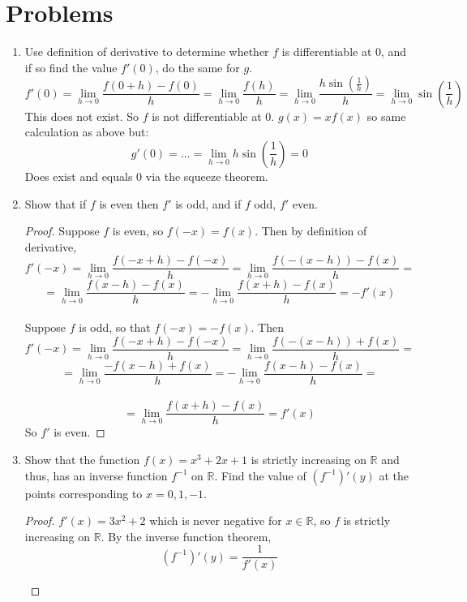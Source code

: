 \documentclass[hidelinks,12pt]{article}
\title{\scalebox{2}{Math 523 Homework 6}}
\author{\scalebox{1.5}{Theo Koss}}
\date{December 2023}
\newcommand{\R}{\mathbb{R}}
\begin{document}
\maketitle

\section*{Problems}
\begin{enumerate}
    \item Use definition of derivative to determine whether $f$ is differentiable at $0$, and if so find the value $f'\left(0\right)$, do the same for $g$. $$f'\left(0\right)=\lim_{h\to0}\frac{f\left(0+h\right)-f\left(0\right)}{h}=\lim_{h\to0}\frac{f\left(h\right)}{h}=\lim_{h\to0}\frac{h\sin\left(\frac{1}{h}\right)}{h}=\lim_{h\to0}\sin\left(\frac{1}{h}\right)$$ This does not exist. So $f$ is not differentiable at $0$. $g\left(x\right)=xf\left(x\right)$ so same calculation as above but: $$g'\left(0\right)=\dots=\lim_{h\to0}h\sin\left(\frac{1}{h}\right)=0$$ Does exist and equals 0 via the squeeze theorem. 
    \item Show that if $f$ is even then $f'$ is odd, and if $f$ odd, $f'$ even.\begin{proof}
        Suppose $f$ is even, so $f\left(-x\right)=f\left(x\right)$. Then by definition of derivative, $$f'\left(-x\right)=\lim_{h\to0}\frac{f\left(-x+h\right)-f\left(-x\right)}{h}=\lim_{h\to0}\frac{f\left(-\left(x-h\right)\right)-f\left(x\right)}{h}=$$
        $$=\lim_{h\to0}\frac{f\left(x-h\right)-f\left(x\right)}{h}=-\lim_{h\to0}\frac{f\left(x+h\right)-f\left(x\right)}{h}=-f'\left(x\right)$$\\
        Suppose $f$ is odd, so that $f\left(-x\right)=-f\left(x\right)$. Then $$f'\left(-x\right)=\lim_{h\to0}\frac{f\left(-x+h\right)-f\left(-x\right)}{h}=\lim_{h\to0}\frac{f\left(-\left(x-h\right)\right)+f\left(x\right)}{h}=$$
        $$=\lim_{h\to0}\frac{-f\left(x-h\right)+f\left(x\right)}{h}=-\lim_{h\to0}\frac{f\left(x-h\right)-f\left(x\right)}{h}=$$\\$$=\lim_{h\to0}\frac{f\left(x+h\right)-f\left(x\right)}{h}=f'\left(x\right)$$ So $f'$ is even.
    \end{proof}
    \item Show that the function $f\left(x\right)=x^3+2x+1$ is strictly increasing on $\R$ and thus, has an inverse function $f^{-1}$ on $\R$. Find the value of $\left(f^{-1}\right)'\left(y\right)$ at the points corresponding to $x=0,1,-1$.\begin{proof}
        $f'\left(x\right)=3x^2+2$ which is never negative for $x\in\R$, so $f$ is strictly increasing on $\R$. By the inverse function theorem, $$\left(f^{-1}\right)'\left(y\right)=\frac{1}{f'\left(x\right)}$$ \begin{itemize}

\end{itemize}
\end{proof}
\end{enumerate}
\end{document}
